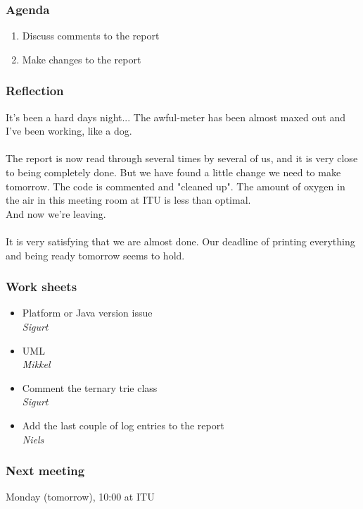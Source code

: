 \subsubsection*{Agenda}
\begin{enumerate}
	\item Discuss comments to the report
	\item Make changes to the report
\end{enumerate}

\subsubsection*{Reflection}
It's been a hard days night... The awful-meter has been almost maxed out and I've been working, like a dog. \\ \\
The report is now read through several times by several of us, and it is very close to being completely done. But we have found a little change we need to make tomorrow. The code is commented and "cleaned up". The amount of oxygen in the air in this meeting room at ITU is less than optimal. \\
And now we're leaving. \\ \\
It is very satisfying that we are almost done. Our deadline of printing everything and being ready tomorrow seems to hold.

\subsubsection*{Work sheets}
\begin{itemize}
	\item Platform or Java version issue \\
		\textsl{Sigurt}
	\item UML \\
		\textsl{Mikkel}
	\item Comment the ternary trie class \\
		\textsl{Sigurt}
	\item Add the last couple of log entries to the report \\
		\textsl{Niels}
\end{itemize}

\subsubsection*{Next meeting}
Monday (tomorrow), 10:00 at ITU